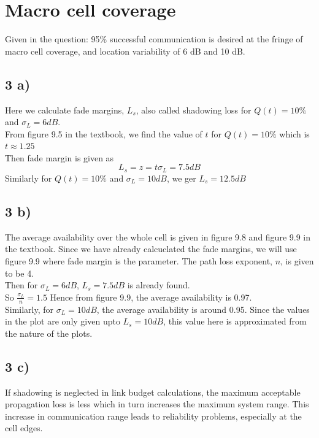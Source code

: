 \documentclass[11pt, oneside]{article}   	%
\begin{document}
\section{Macro cell coverage} 
Given in the question: 95\% successful communication is desired at the fringe of macro cell coverage, and location variability of 6 dB and 10 dB.

\subsection*{3 a)} 
Here we calculate fade margins, $L_s$, also called shadowing loss for $ Q(t) = 10\%$ and $\sigma_L = 6 dB$. \\
From figure 9.5 in the textbook, we find the value of $t$ for  $ Q(t) = 10\%$ which is $t \approx 1.25$\\
Then fade margin is given as 
$$L_s = z = t\sigma_L = 7.5 dB$$
Similarly for  $ Q(t) = 10\%$ and $\sigma_L = 10 dB$, we ger $L_s = 12.5 dB$ \\

\subsection*{3 b)} 
The average availability over the whole cell is given in figure 9.8 and figure 9.9 in the textbook. Since we have already calcuclated the fade margins, we will use figure 9.9 where fade margin is the parameter. The path loss exponent, $n$, is given to be 4.\\

Then for $\sigma_L = 6 dB$, $L_s = 7.5 dB$ is already found.\\
So $\frac{\sigma_L}{n} = 1.5$ Hence from figure 9.9, the average availability is 0.97.\\
Similarly, for $\sigma_L = 10 dB$, the average availability is around 0.95. Since the values in the plot are only given upto $L_s = 10dB$, this value here is approximated from the nature of the plots. 


\subsection*{3 c) }
 If shadowing is neglected in link budget calculations, the maximum acceptable propagation loss is less which in turn increases the maximum system range. This increase in communication range leads to reliability problems, especially at the cell edges.
\end{document}
